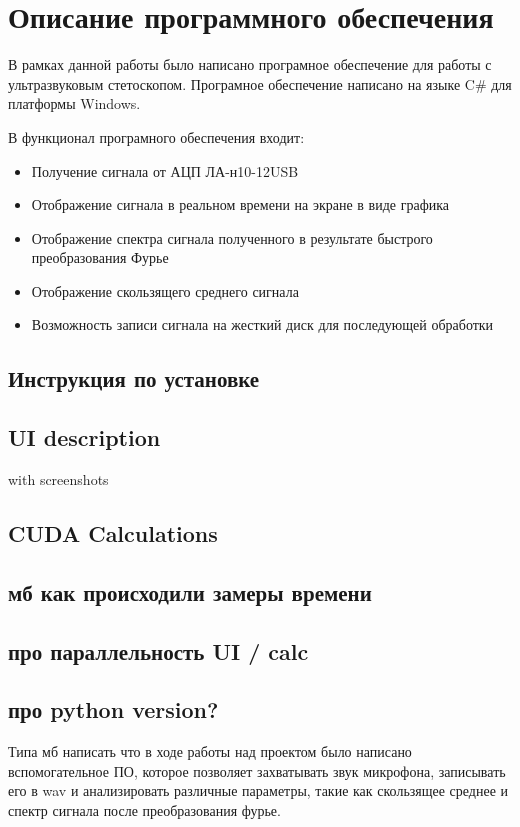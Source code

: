 \newpage
\section{Описание программного обеспечения}
В рамках данной работы было написано програмное обеспечение для работы с ультразвуковым стетоскопом. Програмное обеспечение написано на языке C\# для платформы Windows.

В функционал програмного обеспечения входит:
\begin{itemize}
  \item Получение сигнала от АЦП ЛА-н10-12USB
  \item Отображение сигнала в реальном времени на экране в виде графика
  \item Отображение спектра сигнала полученного в результате быстрого преобразования Фурье
  \item Отображение скользящего среднего сигнала
  \item Возможность записи сигнала на жесткий диск для последующей обработки
\end{itemize}



\subsection{Инструкция по установке}
\subsection{UI description} with screenshots
\subsection{CUDA Calculations}
\subsection{мб как происходили замеры времени}
\subsection{про параллельность UI / calc}
\subsection{про python version?}
Типа мб написать что в ходе работы над проектом было написано вспомогательное ПО, которое позволяет захватывать звук микрофона, записывать его в wav и анализировать различные параметры, такие как скользящее среднее и спектр сигнала после преобразования фурье.

